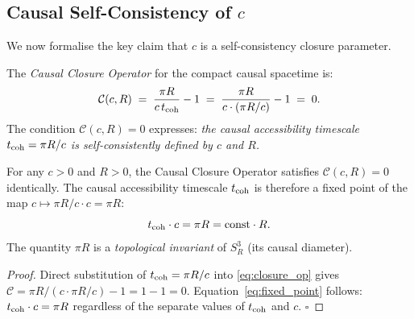 \documentclass[12pt,a4paper]{article}
\theoremstyle{plain}
\theoremstyle{definition}
\theoremstyle{remark}
\begin{document}
\subsection{Causal Self-Consistency of $c$}

We now formalise the key claim that $c$ is a self-consistency closure parameter.

\begin{tcolorbox}[defbox={Definition 5.2 — Causal Closure Operator}]
The \emph{Causal Closure Operator} for the compact causal spacetime is:
\begin{equation}
  \mathcal{C}(c, R)
  \;=\;
  \frac{\pi R}{c\,t_{\rm coh}} - 1
  \;=\;
  \frac{\pi R}{c \cdot (\pi R/c)} - 1
  \;=\; 0.
  \label{eq:closure_op}
\end{equation}
The condition $\mathcal{C}(c, R) = 0$ expresses:
\emph{the causal accessibility timescale $t_{\rm coh} = \pi R/c$
is self-consistently defined by $c$ and $R$.}
\end{tcolorbox}

\begin{tcolorbox}[thmbox={Theorem III — Causal Self-Consistency Closure}]
\label{thm:III}
For any $c > 0$ and $R > 0$, the Causal Closure Operator satisfies
$\mathcal{C}(c, R) = 0$ identically.
The causal accessibility timescale $t_{\rm coh}$ is therefore a fixed point of the map
$c \mapsto \pi R / c \cdot c = \pi R$:
\begin{equation}
  t_{\rm coh} \cdot c = \pi R = \text{const} \cdot R.
  \label{eq:fixed_point}
\end{equation}
The quantity $\pi R$ is a \emph{topological invariant} of $S^3_R$ (its causal diameter).
\end{tcolorbox}

\begin{proof}
Direct substitution of $t_{\rm coh} = \pi R/c$ into \eqref{eq:closure_op} gives
$\mathcal{C} = \pi R / (c \cdot \pi R/c) - 1 = 1 - 1 = 0$.
Equation~\eqref{eq:fixed_point} follows: $t_{\rm coh}\cdot c = \pi R$ regardless of the
separate values of $t_{\rm coh}$ and $c$.
\hfill$\square$
\end{proof}
\end{document}
